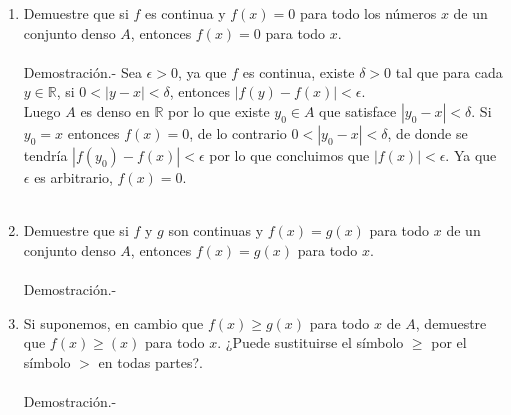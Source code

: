 \begin{enumerate}[\bfseries 1.]
\begin{enumerate}[\bfseries (a)]
	    \item Demuestre que si $f$ es continua y $f(x)=0$ para todo los números $x$ de un conjunto denso $A$, entonces $f(x)=0$ para todo $x$.\\\\
		Demostración.-\; Sea $\epsilon>0$, ya que $f$ es continua, existe $\delta>0$ tal que para cada $y\in \mathbb{R}$, si $0<|y-x|<\delta$, entonces $|f(y)-f(x)|<\epsilon.$\\
		Luego $A$ es denso en $\mathbb{R}$ por lo que existe $y_0\in A$ que satisface $|y_0-x|<\delta.$ Si $y_0=x$ entonces $f(x)=0$, de lo contrario $0<|y_0-x|<\delta$, de donde se tendría $|f(y_0)-f(x)|<\epsilon$ por lo que concluimos que $|f(x)|<\epsilon.$ Ya que $\epsilon$ es arbitrario, $f(x)=0$.\\\\

	    \item Demuestre que si $f$ y $g$ son continuas y $f(x)=g(x)$ para todo $x$ de un conjunto denso $A$, entonces $f(x)=g(x)$ para todo $x$.\\\\
		Demostración.-\;

	    \item Si suponemos, en cambio que $f(x)\geq g(x)$ para todo $x$ de $A$, demuestre que $f(x)\geq(x)$ para todo $x$. ¿Puede sustituirse el símbolo $\geq$ por el símbolo $>$ en todas partes?.\\\\
		Demostración.-\;

	\end{enumerate}

\end{enumerate}

